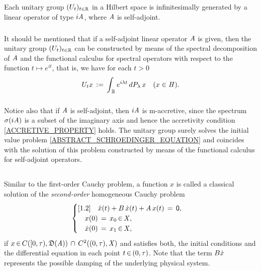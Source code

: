 \documentclass[11pt,twoside]{article}
\begin{document}
\begin{theorem}\label{STONE_THEOREM_FOR_UNITARY_GROUPS}
Each unitary group $({U}_t)_{t \in {\mathbb{R}}}$ in a Hilbert space
is infinitesimally generated by a linear operator of type $i \mathit{A}$,
where $\mathit{A}$ is self-adjoint.
\end{theorem}

\subparagraph{}
It should be mentioned that
if a self-adjoint linear operator $\mathit{A}$ is given,
then the unitary group $({U}_t)_{t \in {\mathbb{R}}}$ can be constructed
by means of the spectral decomposition of $\mathit{A}$ and the functional calculus
for spectral operators with respect to the function $t \mapsto e^{it}$,
that is,
we have for each $t > 0$
\[
{U}_t x \,:=\, \int_{\,{\mathbb{R}}} e^{i \lambda t} \, dP_{\lambda} \,x
\quad (x \in \mathit{H}).
\]

\subparagraph{}
Notice also that if $\mathit{A}$ is self-adjoint, then $i \mathit{A}$ is m-accretive,
since the spectrum $\sigma(i \mathit{A})$ is a subset of the imaginary axis
and hence the accretivity condition \eqref{ACCRETIVE_PROPERTY} holds.
The unitary group surely solves the initial value problem
\eqref{ABSTRACT_SCHROEDINGER_EQUATION} and coincides with the solution
of this problem constructed 
by means of the functional calculus for self-adjoint operators.

\subsection{} %
Similar to the first-order Cauchy problem,
a function $x$ is called
a {classical solution} of the \textit{second-order} homogeneous Cauchy problem
\begin{equation}\label{HOMOGENEOUS_CAUCHY_PROBLEM_2}
\begin{cases}[1.2]
\quad \ddot{x}(t) + {B} \, \dot{x}(t) + \mathit{A} \, x(t) \,=\, {\mathsf{0}},\\
\quad x(0) \,=\, x_0 {\,\in\,} \mathit{X},\\
\quad \dot{x}(0) \,=\, x_1 {\,\in\,} \mathit{X},\\
\end{cases}
\end{equation}
if $x {\,\in\,} C([0,\tau),\mathfrak{D}(\mathit{A})) \, \cap \, C^2((0,\tau),\mathit{X})$
and satisfies both,
the initial conditions and the differential equation
in each point $t {\,\in\,} (0,\tau)$.
Note that the term ${B} \dot{x}$ represents the possible damping
of the underlying physical system.
\end{document}
